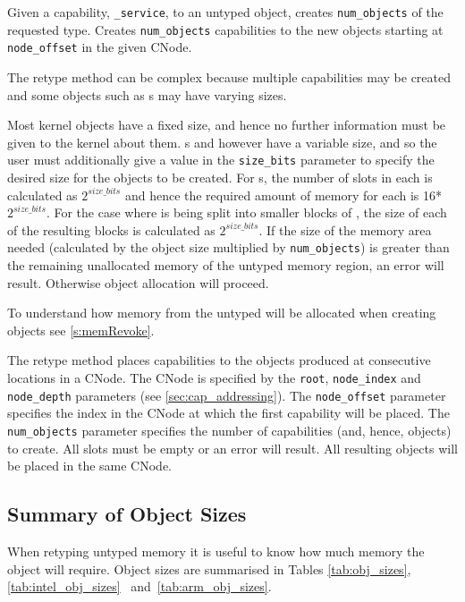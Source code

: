 {
Given a capability, \texttt{\_service}, to an untyped object,  
creates \texttt{num\_objects} of the requested type. Creates 
\texttt{num\_objects} capabilities to the new objects starting 
at \texttt{node\_offset} in the given CNode.

The retype method can be
complex because multiple capabilities may be created and some objects such as
s may have varying sizes.

Most kernel objects have a fixed size, and hence no further information
must be given to the kernel about them. s and  however have a variable size, and so the user must additionally
give a value in the \texttt{size\_bits} parameter to specify the desired
size for the objects to be created.
For s, the number of slots in each  is calculated as
$2^{size\_bits}$ and hence the required amount of memory for each is
16*$2^{size\_bits}$. For the case where  is being split into
smaller blocks of ,
the size of each of the resulting  blocks is 
calculated as $2^{size\_bits}$. If the size of the memory area needed (calculated
by the object size multiplied by \texttt{num\_objects}) is greater than the
remaining unallocated memory of the untyped memory region, an error will result.
Otherwise object allocation will proceed.

To understand how memory from the untyped will be allocated when creating
objects see \autoref{s:memRevoke}.

The retype method places capabilities to the objects produced at consecutive
locations in a CNode. The CNode is specified by the \texttt{root}, 
\texttt{node\_index}
and \texttt{node\_depth} parameters (see \autoref{sec:cap_addressing}). 
The \texttt{node\_offset} parameter  specifies the
index in the CNode at which the first capability will be placed. 
The \texttt{num\_objects}
parameter specifies the number of capabilities (and, hence, objects) 
to create. All slots
must be empty or an error will result. All resulting objects will be
placed in the same CNode. 


\subsection{Summary of Object Sizes}
\label{sec:object_sizes}

When retyping untyped memory it is useful to know how much memory the
object will require. Object sizes are summarised in Tables
\ref{tab:obj_sizes}\ifxeightsix, \ref{tab:intel_obj_sizes}\else\ \fi{} 
and~\ref{tab:arm_obj_sizes}.

}
